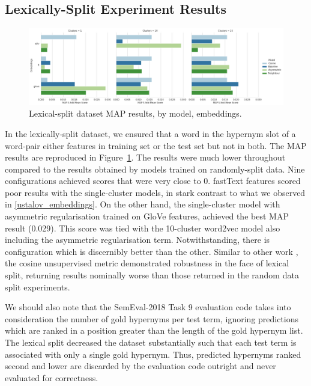 \subsection{Lexically-Split Experiment Results}
\begin{figure}[ht!] 
  \centering
  \includegraphics[width=1.\linewidth]{images/MAP_lexical_split_results_models_baseline_embeddings.png}
  \caption{Lexical-split dataset \ac{MAP} results, by model, embeddings.}
  \label{fig:lexsplit_ustalov_map}
\end{figure}
In the lexically-split dataset, we ensured that a word in the hypernym slot of a word-pair either features in training set or the test set but not in both.  The \ac{MAP} results are reproduced in Figure~\ref{fig:lexsplit_ustalov_map}.  The results were much lower throughout compared to the results obtained by models trained on randomly-split data.  Nine configurations achieved scores that were very close to 0.  fastText features scored poor results with the single-cluster models, in stark contrast to what we observed in \cref{ustalov_embeddings}.  On the other hand, the single-cluster model with asymmetric regularisation trained on GloVe features, achieved the best \ac{MAP} result (0.029).  This score was tied with the 10-cluster word2vec model also including the asymmetric regularisation term.  Notwithstanding, there is configuration which is discernibly better than the other.  Similar to other work \citep{shwartz2017siege}, the cosine unsupervised metric demonstrated robustness in the face of lexical split, returning results nominally worse than those returned in the random data split experiments.

We should also note that the SemEval-2018 Task 9 evaluation code takes into consideration the number of gold hypernyms per test term, ignoring predictions which are ranked in a position greater than the length of the gold hypernym list.  The lexical split decreased the dataset substantially such that each test term is associated with only a single gold hypernym.  Thus, predicted hypernyms ranked second and lower are discarded by the evaluation code outright and never evaluated for correctness.  

